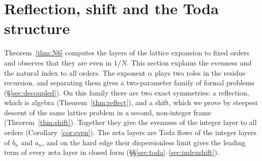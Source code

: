 \section{Reflection, shift and the Toda structure}\label{sec:shiftsec}

Theorem~\ref{thm:N6} computes the layers of the lattice expansion to fixed orders and observes that they are even in $1/N$.
This section explains the evenness and the natural index to all orders. The exponent $\alpha$ plays two roles in the
residue recursion, and separating them gives a two-parameter family of formal problems (\S\ref{sec:decoupled}). On this
family there are two exact symmetries: a reflection, which is algebra (Theorem~\ref{thm:reflect}), and a shift, which we
prove by steepest descent of the same lattice problem in a second, non-integer frame (Theorem~\ref{thm:shift}). Together they
give the evenness of the integer layer to all orders (Corollary~\ref{cor:even}). The zeta layers are Toda flows of the integer
layers of $b_n$ and $a_n$, and on the hard edge their dispersionless limit gives the leading term of every zeta layer in closed form
(\S\S\ref{sec:toda}--\ref{sec:indexshift}).

